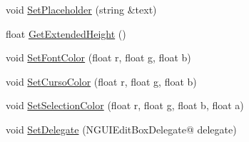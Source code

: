\begin{DoxyCompactItemize}
\item 
void \hyperlink{class_n_g_u_i_edit_box_a836d8d8d179c9e692717df35738210ef}{Set\+Placeholder} (string \&text)
\item 
float \hyperlink{class_n_g_u_i_edit_box_a65a3537ee6dd5bc44c2c45abbf937a70}{Get\+Extended\+Height} ()
\item 
void \hyperlink{class_n_g_u_i_edit_box_ad2050664dcd6afc32149ccabfd4ef994}{Set\+Font\+Color} (float r, float g, float b)
\item 
void \hyperlink{class_n_g_u_i_edit_box_a612e8b7dd6ae2bf019e7dc39a5b0b186}{Set\+Curso\+Color} (float r, float g, float b)
\item 
void \hyperlink{class_n_g_u_i_edit_box_a34b1b792f4692e22c137af73401458c6}{Set\+Selection\+Color} (float r, float g, float b, float a)
\item 
void \hyperlink{class_n_g_u_i_edit_box_a11b4db699a702895c28afaf875b62ae9}{Set\+Delegate} (N\+G\+U\+I\+Edit\+Box\+Delegate@ delegate)
\end{DoxyCompactItemize}
